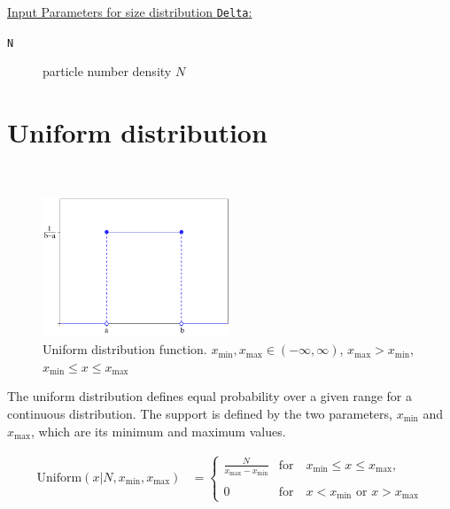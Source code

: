 \vspace{5mm}
\uline{Input Parameters for size distribution \texttt{Delta}:}
\begin{description}
\item[\texttt{N}] particle number density $N$
\end{description}



\section{Uniform distribution} \hspace{1pt} \\

\begin{figure}[htb]
\begin{center}
\includegraphics[width=0.5\textwidth]{Uniform.png}
\end{center}
\caption{Uniform distribution function. $x_\text{min},x_\text{max} \in
(-\infty,\infty)$, $x_\text{max}>x_\text{min}$, $x_\text{min}\leq x \leq x_\text{max}$} \label{Uniform}
\end{figure}

The uniform distribution defines equal probability over a given range for a continuous distribution.
The support is defined by the two parameters, $x_\text{min}$ and $x_\text{max}$, which are its
minimum and maximum values.

\begin{subequations}
\begin{align}
\text{Uniform}(x\vert N, x_\text{min},x_\text{max}) & =
   \begin{cases}
      \displaystyle \frac{N}{x_\text{max}-x_\text{min}} & \text{for} \quad x_\text{min}\leq x\leq x_\text{max}, \\
      & \\
      \displaystyle 0               & \text{for} \quad x< x_\text{min} \text{~or~} x>x_\text{max}
   \end{cases}
\end{align}
\end{subequations}

